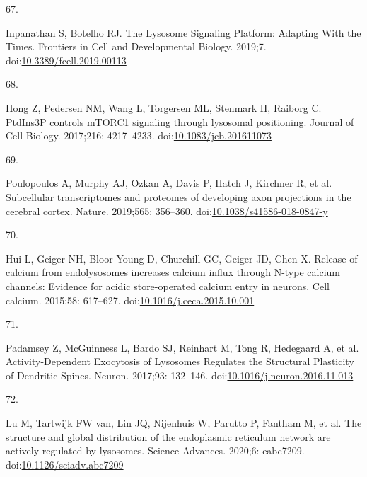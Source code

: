 \documentclass[
  12pt,
  a4paper,
]{book}
\newlength{\cslhangindent}
\newlength{\csllabelwidth}
\newlength{\cslentryspacingunit} %
\newenvironment{CSLReferences}[2] %
 {%
  \setlength{\parindent}{0pt}
  \ifodd #1
  \let\oldpar\par
  \def\par{\hangindent=\cslhangindent\oldpar}
  \fi
  \setlength{\parskip}{#2\cslentryspacingunit}
 }%
 {}
\newcommand{\CSLLeftMargin}[1]{\parbox[t]{\csllabelwidth}{#1}}
\newcommand{\CSLRightInline}[1]{\parbox[t]{\linewidth - \csllabelwidth}{#1}\break}
\begin{document}
\begin{CSLReferences}{0}{0}
\leavevmode{}%
\CSLLeftMargin{67. }%
\CSLRightInline{Inpanathan S, Botelho RJ. The {Lysosome Signaling Platform}: {Adapting With} the {Times}. Frontiers in Cell and Developmental Biology. 2019;7. doi:\href{https://doi.org/10.3389/fcell.2019.00113}{10.3389/fcell.2019.00113}}

\leavevmode{}%
\CSLLeftMargin{68. }%
\CSLRightInline{Hong Z, Pedersen NM, Wang L, Torgersen ML, Stenmark H, Raiborg C. {PtdIns3P} controls {mTORC1} signaling through lysosomal positioning. Journal of Cell Biology. 2017;216: 4217--4233. doi:\href{https://doi.org/10.1083/jcb.201611073}{10.1083/jcb.201611073}}

\leavevmode{}%
\CSLLeftMargin{69. }%
\CSLRightInline{Poulopoulos A, Murphy AJ, Ozkan A, Davis P, Hatch J, Kirchner R, et al. Subcellular transcriptomes and proteomes of developing axon projections in the cerebral cortex. Nature. 2019;565: 356--360. doi:\href{https://doi.org/10.1038/s41586-018-0847-y}{10.1038/s41586-018-0847-y}}

\leavevmode{}%
\CSLLeftMargin{70. }%
\CSLRightInline{Hui L, Geiger NH, Bloor-Young D, Churchill GC, Geiger JD, Chen X. Release of calcium from endolysosomes increases calcium influx through {N-type} calcium channels: {Evidence} for acidic store-operated calcium entry in neurons. Cell calcium. 2015;58: 617--627. doi:\href{https://doi.org/10.1016/j.ceca.2015.10.001}{10.1016/j.ceca.2015.10.001}}

\leavevmode{}%
\CSLLeftMargin{71. }%
\CSLRightInline{Padamsey Z, McGuinness L, Bardo SJ, Reinhart M, Tong R, Hedegaard A, et al. Activity-{Dependent Exocytosis} of {Lysosomes Regulates} the {Structural Plasticity} of {Dendritic Spines}. Neuron. 2017;93: 132--146. doi:\href{https://doi.org/10.1016/j.neuron.2016.11.013}{10.1016/j.neuron.2016.11.013}}

\leavevmode{}%
\CSLLeftMargin{72. }%
\CSLRightInline{Lu M, Tartwijk FW van, Lin JQ, Nijenhuis W, Parutto P, Fantham M, et al. The structure and global distribution of the endoplasmic reticulum network are actively regulated by lysosomes. Science Advances. 2020;6: eabc7209. doi:\href{https://doi.org/10.1126/sciadv.abc7209}{10.1126/sciadv.abc7209}}


\end{CSLReferences}
\end{document}
